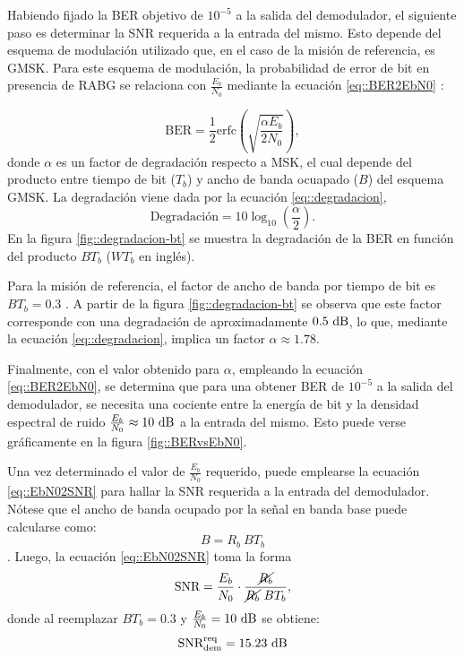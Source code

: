 \documentclass[../../main.tex]{subfiles}
\begin{document}
Habiendo fijado la BER objetivo de $10^{-5}$ a la salida del demodulador, el siguiente paso es determinar la SNR requerida a la entrada del mismo. Esto depende del esquema de modulación utilizado que, en el caso de la misión de referencia, es GMSK. Para este esquema de modulación, la probabilidad de error de bit en presencia de RABG se relaciona con $\frac{E_b}{N_0}$ mediante la ecuación \ref{eq::BER2EbN0} \cite{haykin}:

\begin{equation}
    \textrm{BER} = \frac{1}{2} \textrm{erfc}\left(\sqrt{\frac{\alpha E_b}{2 N_0}}\right),
    \label{eq::BER2EbN0}
\end{equation}
donde $\alpha$ es un factor de degradación respecto a MSK, el cual depende del producto entre tiempo de bit ($T_b$) y ancho de banda ocuapado ($B$) del esquema GMSK. La degradación viene dada por la ecuación \ref{eq::degradacion},
\begin{equation}
    \textrm{Degradación} = 10 \log_{10}{\left(\frac{\alpha}{2}\right).}
    \label{eq::degradacion}
\end{equation}
En la figura \ref{fig::degradacion-bt} se muestra la degradación de la BER en función del producto $B T_b$ ($W T_b$ en inglés).

Para la misión de referencia, el factor de ancho de banda por tiempo de bit es $BT_b = 0.3$ \cite{BEESAT-9}. A partir de la figura \ref{fig::degradacion-bt} se observa que este factor corresponde con una degradación de aproximadamente $0.5~\textrm{dB}$, lo que, mediante la ecuación \ref{eq::degradacion}, implica un factor $\alpha \approx 1.78$.

Finalmente, con el valor obtenido para $\alpha$, empleando la ecuación \ref{eq::BER2EbN0}, se determina que para una obtener BER de $10^{-5}$ a la salida del demodulador, se necesita una cociente entre la energía de bit y la densidad espectral de ruido $\frac{E_b}{N_0} \approx 10~\textrm{dB}$ a la entrada del mismo. Esto puede verse gráficamente en la figura \ref{fig::BERvsEbN0}.

Una vez determinado el valor de $\frac{E_b}{N_0}$ requerido, puede emplearse la ecuación \ref{eq::EbN02SNR} para hallar la SNR requerida a la entrada del demodulador. Nótese que el ancho de banda ocupado por la señal en banda base puede calcularse como:
\[B = R_b \ B T_b\].
Luego, la ecuación \ref{eq::EbN02SNR} toma la forma
\[\textrm{SNR} = \frac{E_b}{N_0} \cdot \frac{\cancel{R_b}}{\cancel{R_b} \ B T_b},\] donde al reemplazar $BT_b = 0.3$ y $\frac{E_b}{N_0} = 10~\textrm{dB}$ se obtiene:
\begin{equation}
    \textrm{SNR}^\textrm{req}_\textrm{dem} = 15.23~\textrm{dB}
    \label{eq::SNR-req}
\end{equation}
\end{document}
